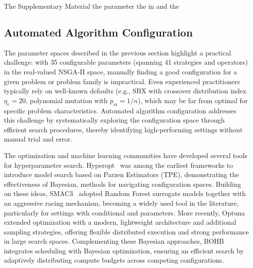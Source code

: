 \documentclass[final,5p,times,twocolumn]{elsarticle}
\newcommand{\VAMOS}{VAMOS}
\begin{document}
The Supplementary Material  the  parameter  the \revision{corresponding \VAMOS{} space is given} in  and  the 

\subsection{Automated Algorithm Configuration}
\label{sec:aac}

The parameter spaces described in the previous section highlight a practical challenge: with 35 configurable parameters (spanning 41 strategies and operators) in the real-valued NSGA-II space, manually finding a good configuration for a given problem or problem family is impractical. Even experienced practitioners typically rely on well-known defaults (e.g., SBX with crossover distribution index $\eta_c = 20$, polynomial mutation with $p_m = 1/n$), which may be far from optimal for specific problem characteristics. Automated algorithm configuration addresses this challenge by systematically exploring the configuration space through efficient search procedures, thereby identifying high-performing settings without manual trial and error.


The optimization and machine learning communities have developed several  tools for hyperparameter search. Hyperopt~\cite{bergstra2013making} was among the earliest frameworks to introduce  model search based on  Parzen Estimators (TPE), demonstrating the effectiveness of Bayesian,  methods for navigating  configuration spaces. Building on these ideas, SMAC3~\cite{LEF+22} adopted Random Forest surrogate models together with an aggressive racing mechanism, becoming a widely used tool in the  literature, particularly for settings with conditional and  parameters. More recently, Optuna~\cite{ASY+19} extended  optimization with a modern, lightweight architecture and additional sampling strategies, offering flexible distributed execution and strong performance in large search spaces. Complementing these Bayesian approaches, BOHB~\cite{FKH18} integrates  scheduling with Bayesian optimization, ensuring an efficient search by adaptively distributing compute budgets across competing configurations.
\end{document}
